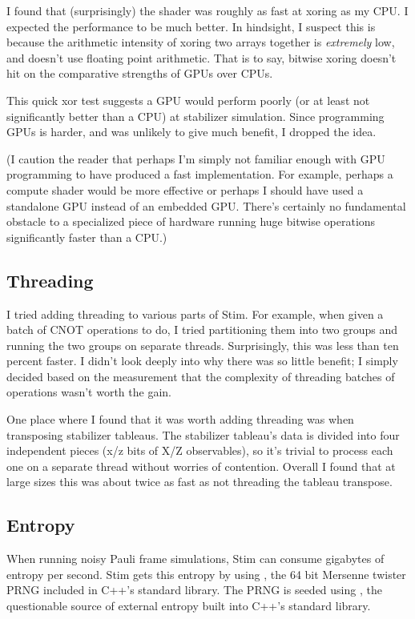 \documentclass[onecolumn,unpublished]{quantumarticle}
\theoremstyle{definition}
\theoremstyle{definition}
\theoremstyle{definition}
\begin{document}
I found that (surprisingly) the shader was roughly as fast at xoring as my CPU.
I expected the performance to be much better.
In hindsight, I suspect this is because the arithmetic intensity of xoring two arrays together is {\em extremely} low, and doesn't use floating point arithmetic.
That is to say, bitwise xoring doesn't hit on the comparative strengths of GPUs over CPUs.

This quick xor test suggests a GPU would perform poorly (or at least not significantly better than a CPU) at stabilizer simulation.
Since programming GPUs is harder, and was unlikely to give much benefit, I dropped the idea.

(I caution the reader that perhaps I'm simply not familiar enough with GPU programming to have produced a fast implementation.
For example, perhaps a compute shader would be more effective or perhaps I should have used a standalone GPU instead of an embedded GPU.
There's certainly no fundamental obstacle to a specialized piece of hardware running huge bitwise operations significantly faster than a CPU.)

\subsection{Threading}

I tried adding threading to various parts of Stim.
For example, when given a batch of CNOT operations to do, I tried partitioning them into two groups and running the two groups on separate threads.
Surprisingly, this was less than ten percent faster.
I didn't look deeply into why there was so little benefit; I simply decided based on the measurement that the complexity of threading batches of operations wasn't worth the gain.

One place where I found that it was worth adding threading was when transposing stabilizer tableaus.
The stabilizer tableau's data is divided into four independent pieces (x/z bits of X/Z observables), so it's trivial to process each one on a separate thread without worries of contention.
Overall I found that at large sizes this was about twice as fast as not threading the tableau transpose.


\subsection{Entropy}
\label{sec:randomness}

When running noisy Pauli frame simulations, Stim can consume gigabytes of entropy per second.
Stim gets this entropy by using , the 64 bit Mersenne twister PRNG included in C++'s standard library.
The PRNG is seeded using , the questionable \cite{cpprandomtroubles2020} source of external entropy built into C++'s standard library.
\end{document}
